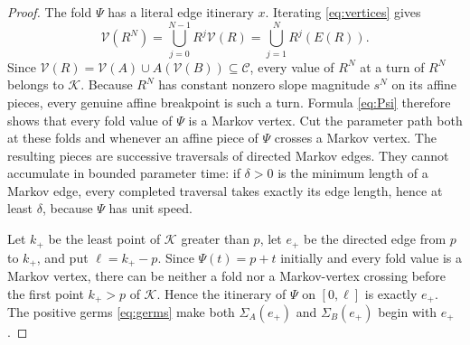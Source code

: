 \documentclass[11pt]{article}
\begin{document}
\begin{proof}
The fold $\Psi$ has a literal edge itinerary $x$. Iterating \eqref{eq:vertices} gives
\[
\mathcal V(R^N)=\bigcup_{j=0}^{N-1}R^j\mathcal V(R)
 =\bigcup_{j=1}^{N}R^j(E(R)).
\]
Since $\mathcal V(R)=\mathcal V(A)\cup A(\mathcal V(B))\subseteq\mathcal C$, every value of
$R^N$ at a turn of $R^N$ belongs to $\mathcal K$. Because $R^N$ has constant nonzero slope magnitude
$s^N$ on its affine pieces, every genuine affine breakpoint is such a turn. Formula \eqref{eq:Psi}
therefore shows that every
fold value of $\Psi$ is a Markov vertex. Cut the parameter path both at these folds and whenever an
affine piece of $\Psi$ crosses a Markov vertex. The resulting pieces are successive traversals of directed
Markov edges. They cannot accumulate in bounded parameter time: if $\delta>0$ is the minimum length
of a Markov edge, every completed traversal takes exactly its edge length, hence at least $\delta$, because
$\Psi$ has unit speed.

Let $k_+$ be the least point of $\mathcal K$ greater than $p$, let $e_+$ be the directed edge from
$p$ to $k_+$, and put $\ell=k_+-p$. Since $\Psi(t)=p+t$ initially and every fold value is a Markov vertex, there can be neither a fold nor a
Markov-vertex crossing before the first point $k_+>p$ of $\mathcal K$. Hence the itinerary of $\Psi$
on $[0,\ell]$ is exactly $e_+$. The positive germs \eqref{eq:germs} make both
$\Sigma_A(e_+)$ and $\Sigma_B(e_+)$ begin with $e_+$.


\end{proof}
\end{document}
